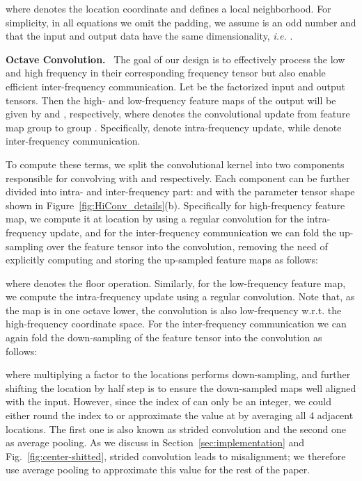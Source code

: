 \documentclass[10pt,twocolumn,letterpaper]{article}
\newcommand{\hiConvName}[0]{Octave Convolution\xspace}
\newcommand{\myparagraph}[1]{\vspace{1pt}\noindent\textbf{#1.}~}
\begin{document}
where  denotes the location coordinate and   defines a local neighborhood. For simplicity, in all equations we omit the padding, we assume  is an odd number and that the input and output data have the same dimensionality, \emph{i.e.} .

\myparagraph{\hiConvName}
The goal of our design is to effectively process the low and high frequency in their corresponding frequency tensor but also enable efficient inter-frequency communication. 
Let  be the factorized input and output tensors. 
Then the high- and low-frequency feature maps of the output  will be given by  and , respectively, where  denotes the convolutional update from feature map group  to group . Specifically,  denote intra-frequency update, while  denote inter-frequency communication.

To compute these terms, we split the convolutional kernel  into two components  responsible for convolving with  and  respectively. Each component can be further divided into intra- and inter-frequency part:  and  with the parameter tensor shape shown in Figure~\ref{fig:HiConv_details}(b).
Specifically for high-frequency feature map, we compute it at location  by using a regular convolution for the intra-frequency update, and for the inter-frequency communication we can fold the up-sampling over the feature tensor  into the convolution, removing the need of explicitly computing and storing the up-sampled feature maps as follows:

where   denotes the floor operation.
Similarly, for the low-frequency feature map, we compute the intra-frequency update using a regular convolution. Note that, as the map is in one octave lower, the convolution is also low-frequency w.r.t. the high-frequency coordinate space. For the inter-frequency communication we can again fold the down-sampling of the feature tensor  into the convolution as follows:

where multiplying a factor  to the locations  performs down-sampling, and further shifting the location by half step is to ensure the down-sampled maps well aligned with the input. However, since the index of  can only be an integer, we could either round the index to  or approximate the value at  by averaging all 4 adjacent locations. The first one is also known as strided convolution and the second one as average pooling. As we discuss in Section~\ref{sec:implementation} and Fig.~\ref{fig:center-shitted}, strided convolution leads to misalignment; we therefore use average pooling to approximate this value for the rest of the paper.
\end{document}
